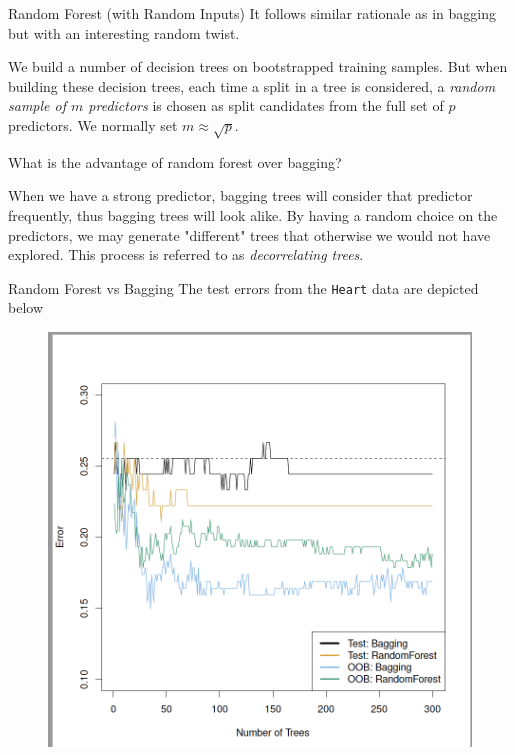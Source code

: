 \documentclass{beamer}
\begin{document}
\begin{frame}{Random Forest (with Random Inputs)}
	It follows similar rationale as in bagging but with an interesting random twist.
	
	We build a number of decision trees on bootstrapped training samples. But when building these decision trees, each time a split in a tree is considered, a {\it random sample of $m$ predictors} is chosen as split candidates from the full set of $p$ predictors.  We normally set $m\approx \sqrt{p}$.
	
	What is the advantage of random forest over bagging?
	
	When we have a strong predictor, bagging trees will consider that predictor frequently, thus bagging trees will look alike. By having a random choice on the predictors, we may generate "different" trees that otherwise we would not have explored. This process is referred to as {\it decorrelating trees}. 

\end{frame}

\begin{frame}{Random Forest vs Bagging}
	The test errors from the {\tt Heart} data are depicted below
	 \begin{figure}[h]
		\centering
		\includegraphics[scale=0.35]{../../Figures/fig_bagging.png}
	\end{figure}
\end{frame}
\end{document}
